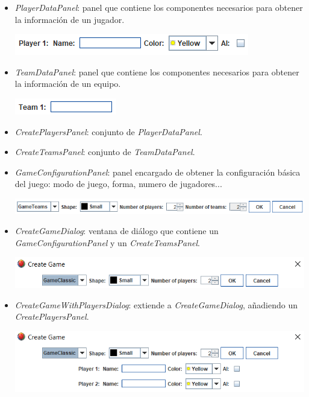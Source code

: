 \documentclass[../DocumentoOficial.tex]{subfiles}
\begin{document}
\begin{sprint}[6]
\begin{itemize}
\item \textit{PlayerDataPanel}: panel que contiene los componentes necesarios para obtener la información de un jugador.
\begin{center}
\includegraphics[scale=1]{player-data-panel.png}
\end{center}
\item \textit{TeamDataPanel}: panel que contiene los componentes necesarios para obtener la información de un equipo.
\begin{center}
\includegraphics[scale=1]{team-data-panel.png}
\end{center}
\item \textit{CreatePlayersPanel}: conjunto de \textit{PlayerDataPanel}.
\item \textit{CreateTeamsPanel}: conjunto de \textit{TeamDataPanel}.
\item \textit{GameConfigurationPanel}: panel encargado de obtener la configuración básica del juego: modo de juego, forma, numero de jugadores...
\begin{center}
\includegraphics[scale=0.75]{game-config-panel.png}
\end{center}
\item \textit{CreateGameDialog}: ventana de diálogo que contiene un \textit{GameConfigurationPanel} y un \textit{CreateTeamsPanel}.
\begin{center}
\includegraphics[scale=0.8]{create-game-sprint6.png}
\end{center}
\item \textit{CreateGameWithPlayersDialog}: extiende a \textit{CreateGameDialog}, añadiendo un \textit{CreatePlayersPanel}.
\begin{center}
\includegraphics[scale=0.75]{create-game-players-sprint6.png}
\end{center}
\end{itemize}



\end{sprint}
\end{document}
